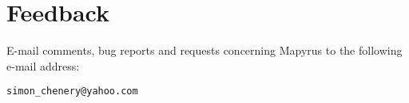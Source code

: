 
\section{Feedback}

E-mail comments, bug reports and requests concerning Mapyrus to
the following e-mail address:

\begin{verbatim}
simon_chenery@yahoo.com
\end{verbatim}

